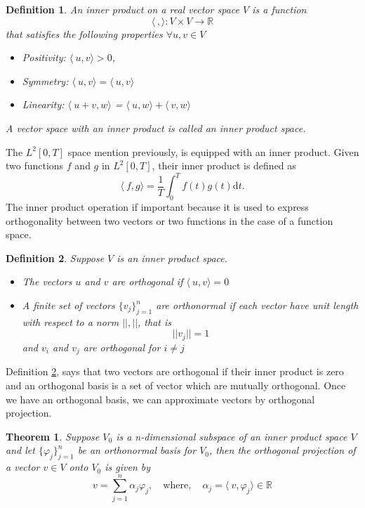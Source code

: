 \documentclass[11pt, oneside]{article}   	%
\newtheorem{theorem}{Theorem}
\newtheorem{definition}{Definition}
\begin{document}
\begin{definition}
An inner product on a real vector space $V$ is a function 
\begin{equation}
\langle\,,\rangle : V\times V \rightarrow \mathbb{R} \nonumber
\end{equation}
that satisfies the following properties $\forall u,v \in V$
\begin{itemize}
\item Positivity: $\langle\ u,v \rangle > 0$, \quad 
\item Symmetry: $\langle\ u,v \rangle  = \langle\ u,v \rangle$
\item Linearity: $\langle\ u+v,w \rangle$ = $\langle\ u,w \rangle +\langle\ v,w \rangle$
\end{itemize}
A vector space with an inner product is called an inner product space.
\end{definition}
The $L^{2}[0,T]$ space mention previously, is equipped with an inner product.  
Given two functions $f$ and $g$ in $L^{2}[0,T]$, their inner product is defined as 
\begin{equation}
\langle\ f,g \rangle = \frac{1}{T}\int_{0}^{T}f(t)g(t)\mathrm{d}t.
\end{equation}
The inner product operation if important because it is used to express orthogonality between two vectors or two functions in the case of a function space.

\begin{definition}\label{ortho}
Suppose $V$ is an inner product space.
\begin{itemize}
\item The vectors $u$ and $v$ are orthogonal if $\langle\ u,v \rangle = 0$
\item A finite set of vectors $\{ v_{j} \}_{j=1}^{n}$ are orthonormal if each vector have unit length with respect to a norm $||, ||$, that is 
\begin{equation}
||v_{j}|| = 1 \nonumber
\end{equation}
and $v_{i}$ and $v_{j}$ are orthogonal for $i\neq j$ 
\end{itemize}
\end{definition}
Definition \ref{ortho}, says that two vectors are orthogonal if their inner product is zero and an orthogonal basis is a set of vector which are mutually orthogonal. Once we have an orthogonal basis,
we can approximate vectors by orthogonal projection.

\begin{theorem}\label{orthogonalityTheorem}
Suppose $V_{0}$ is a  n-dimensional subspace of an inner product space $V$ and let $\{  \varphi_{j} \}_{j=1}^{n}$ be an orthonormal basis for $V_{0}$, then the orthogonal projection
of a vector $v\in V$ onto $V_{0}$ is given by 
\begin{equation}
v = \sum_{j=1}^{n}\alpha_{j}\varphi_{j}, \quad \text{where}, \quad \alpha_{j} = \langle\ v,\varphi_{j} \rangle \in \mathbb{R}
\end{equation}
\end{theorem}
\end{document}
